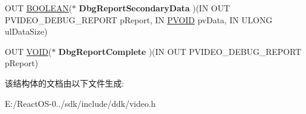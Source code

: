 \begin{DoxyCompactItemize}
O\+UT \hyperlink{_processor_bind_8h_a112e3146cb38b6ee95e64d85842e380a}{B\+O\+O\+L\+E\+AN}($\ast$ {\bfseries Dbg\+Report\+Secondary\+Data} )(IN O\+UT P\+V\+I\+D\+E\+O\+\_\+\+D\+E\+B\+U\+G\+\_\+\+R\+E\+P\+O\+RT p\+Report, IN \hyperlink{interfacevoid}{P\+V\+O\+ID} pv\+Data, IN U\+L\+O\+NG ul\+Data\+Size)
\item 
\mbox{\label{struct___v_i_d_e_o___p_o_r_t___d_e_b_u_g___r_e_p_o_r_t___i_n_t_e_r_f_a_c_e_a424dc45411289fd49c5e48eae7f68a7b}} 
O\+UT \hyperlink{interfacevoid}{V\+O\+ID}($\ast$ {\bfseries Dbg\+Report\+Complete} )(IN O\+UT P\+V\+I\+D\+E\+O\+\_\+\+D\+E\+B\+U\+G\+\_\+\+R\+E\+P\+O\+RT p\+Report)
\end{DoxyCompactItemize}


该结构体的文档由以下文件生成\+:\begin{DoxyCompactItemize}
\item 
E\+:/\+React\+O\+S-\/0../sdk/include/ddk/video.\+h\end{DoxyCompactItemize}
